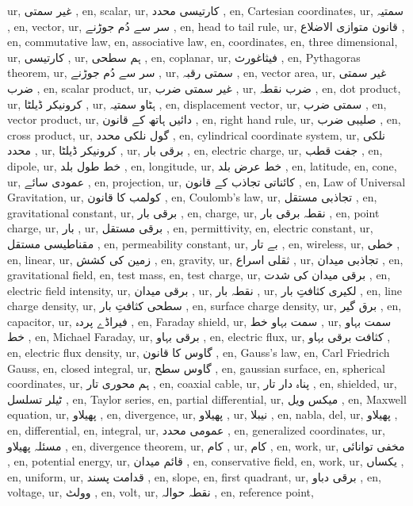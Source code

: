 ur, غیر سمتی ,
en, scalar,
ur, کارتیسی محدد ,
en, Cartesian coordinates,
ur, سمتیہ ,
en, vector,
ur, سر سے دُم جوڑنے ,
en, head to tail rule,
ur, قانون متوازی الاضلاع ,
en, commutative law,
en, associative law,
en, coordinates,
en, three dimensional,
ur, کارتیسی ,
ur, ہم سطحی ,
en, coplanar,
ur, فیثاغورث ,
en, Pythagoras theorem,
ur, سر سے دُم جوڑنے ,
ur, سمتی رقبہ ,
en, vector area,
ur, غیر سمتی ضرب ,
en, scalar product,
ur, غیر سمتی ضرب ,
ur, ضرب نقطہ ,
en, dot product,
ur, کرونیکر ڈیلٹا ,
ur, ہٹاو سمتیہ ,
en, displacement vector,
ur, سمتی ضرب ,
en, vector product,
ur, دائیں ہاتھ کے قانون ,
en, right hand rule,
ur, صلیبی ضرب ,
en, cross product,
ur, گول نلکی محدد ,
en, cylindrical coordinate system,
ur, نلکی محدد ,
ur, کرونیکر ڈیلٹا ,
ur, برقی بار ,
en, electric charge,
ur, جفت قطب ,
en, dipole,
ur, خط طول بلد ,
en, longitude,
ur, خط عرض بلد ,
en, latitude,
en, cone,
ur, عمودی سائے ,
en, projection,
ur, کائناتی تجاذب کے قانون ,
en, Law of Universal Gravitation,
ur, کولمب کا قانون ,
en, Coulomb's law,
ur, تجاذبی مستقل ,
en, gravitational constant,
ur, برقی بار ,
en, charge,
ur, نقطہ برقی بار ,
en, point charge,
ur, بار ,
ur, برقی مستقل ,
en, permittivity,
en, electric constant,
ur, مقناطیسی مستقل ,
en, permeability constant,
ur, بے تار ,
en, wireless,
ur, خطی ,
en, linear,
ur, زمین کی کشش ,
en, gravity,
ur, ثقلی اسراع ,
ur, تجاذبی میدان ,
en, gravitational field,
en, test mass,
en, test charge,
ur, برقی میدان کی شدت ,
en, electric field intensity,
ur, برقی میدان ,
ur, نقطہ بار ,
ur, لکیری کثافتِ بار ,
en, line charge density,
ur, سطحی کثافتِ بار ,
en, surface charge density,
ur, برق گیر ,
en, capacitor,
ur, فیراڈے پردہ ,
en, Faraday shield,
ur, سمت بہاو خط ,
ur, سمت بہاو خط ,
en, Michael Faraday,
ur, برقی بہاو ,
en, electric flux,
ur, کثافت برقی بہاو ,
en, electric flux density,
ur, گاوس کا قانون ,
en, Gauss's law,
en, Carl Friedrich Gauss,
en, closed integral,
ur, گاوس سطح ,
en, gaussian surface,
en, spherical coordinates,
ur, ہم محوری تار ,
en, coaxial cable,
ur, پناہ دار تار ,
en, shielded,
ur, ٹیلر تسلسل ,
en, Taylor series,
en, partial differential,
ur, میکس ویل ,
en, Maxwell equation,
ur, پھیلاو ,
en, divergence,
ur, پھیلاو ,
ur, نیبلا ,
en, nabla, del,
ur, پھیلاو ,
en, differential,
en, integral,
ur, عمومی محدد ,
en, generalized coordinates,
ur, مسئلہ پھیلاو ,
en, divergence theorem,
ur, کام ,
ur, کام ,
en, work,
ur, مخفی توانائی ,
en, potential energy,
ur, قائم میدان ,
en, conservative field,
en, work,
ur, یکساں ,
en, uniform,
ur, قدامت پسند ,
en, slope,
en, first quadrant,
ur, برقی دباو ,
en, voltage,
ur, وولٹ ,
en, volt,
ur, نقطہ حوالہ ,
en, reference point,
